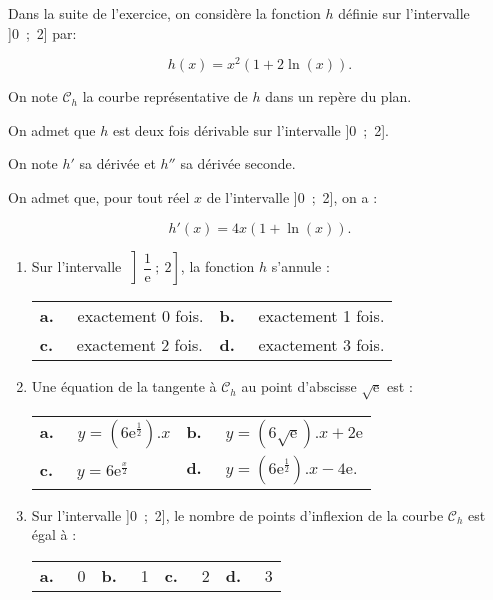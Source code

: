 \documentclass[10pt,a4paper]{article}
\begin{document}
Dans la suite de l'exercice, on considère la fonction $h$ définie sur l'intervalle ]0~;~2] par:

\[h(x) = x^2(1 + 2\ln (x)).\]

On note $\mathcal{C}_h$ la courbe représentative de $h$ dans un repère du plan. 

On admet que $h$ est deux fois dérivable sur l'intervalle ]0~;~2].

On note $h'$ sa dérivée et $h''$ sa dérivée seconde.

On admet que, pour tout réel $x$ de l'intervalle ]0~;~2], on a : 

\[h'(x) = 4x(1 + \ln (x)).\]

\begin{enumerate}[resume]
\item Sur l'intervalle $\left]\dfrac{1}{\text{e}}~;~2\right]$, la fonction $h$ s'annule :

\begin{center}
\begin{tabularx}{\linewidth}{*{2}{X}}
\textbf{a.~~} exactement 0 fois. &\textbf{b.~~} exactement 1 fois.\\
 \textbf{c.~~} exactement 2 fois. &\textbf{d.~~} exactement 3 fois.
\end{tabularx}
\end{center}

\item Une équation de la tangente à $\mathcal{C}_h$ au point d'abscisse $\sqrt{\text{e}}$ est :

\begin{center}
\begin{tabularx}{\linewidth}{*{2}{X}}
\textbf{a.~~} $y = \left(6\text{e}^{\frac12}\right) .{} x $&
\textbf{b.~~} $y = \left(6\sqrt{\text{e}}\right).{} x + 2\text{e}$\\
\textbf{c.~~} $y = 6\text{e}^{\frac{x}{2}}$&\textbf{d.~~} $y = \left(6\text{e}^{\frac12}\right) .{} x - 4\text{e}$.
\end{tabularx}
\end{center}

\item Sur l'intervalle ]0~;~2], le nombre de points d'inflexion de la courbe $\mathcal{C}_h$ est égal à :

\begin{center}
\begin{tabularx}{\linewidth}{*{4}{X}}
\textbf{a.~~} 0&\textbf{b.~~} 1 &\textbf{c.~~}  2 &\textbf{d.~~}  3
\end{tabularx}
\end{center}


\end{enumerate}
\end{document}
